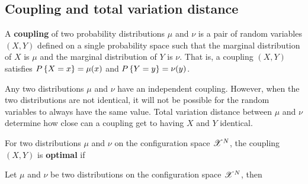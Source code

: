 \documentclass[letterpaper,english,10pt]{article}
\begin{document}
\subsection{Coupling and total variation distance}
\begin{defn}
A \textbf{coupling} of two probability distributions $\mu$ and $\nu$ is a pair of random variables $(X, Y)$ 
defined on a single probability space such that the marginal distribution of $X$ is $\mu$ and the marginal distribution of $Y$ is $\nu$. 
That is, a coupling $(X, Y)$ satisfies $P\left\{X = x\right\} = \mu(x)$ and $P\left\{Y = y\right\} = \nu(y)$. 
\end{defn}

Any two distributions $\mu$ and $\nu$ have an independent coupling. 
However, when the two distributions are not identical, 
it will not be possible for the random variables to always have the same value. 
Total variation distance between $\mu$ and $\nu$ determine how close can a coupling get to having $X$ and $Y$ identical. 
\begin{defn}
For two distributions $\mu$ and $\nu$ on the configuration space $\mathscr{X}^N$, 
the coupling $(X,Y)$ is \textbf{optimal} if  
\end{defn}
\begin{prop}
Let $\mu$ and $\nu$ be two distributions on the configuration space $\mathscr{X}^N$, then 
\end{prop}
\end{document}
